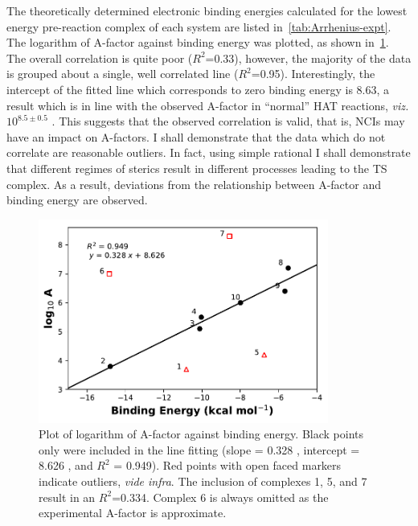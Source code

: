 The theoretically determined electronic binding energies calculated for the lowest energy pre-reaction complex of each system are listed in~\ref{tab:Arrhenius-expt}. The logarithm of A-factor against binding energy was plotted, as shown in~\ref{fig:Arrhenius}. The overall correlation is quite poor ($R^2$=0.33), however, the majority of the data is grouped about a single, well correlated line ($R^2$=0.95). Interestingly, the intercept of the fitted line which corresponds to zero binding energy is 8.63, a result which is in line with the observed A-factor in ``normal'' HAT reactions, \emph{viz. }$10^{8.5\pm0.5}$ \Ms.\cite{Benson1976} This suggests that the observed correlation is valid, that is, NCIs may have an impact on A-factors. I shall demonstrate that the data which do not correlate are reasonable outliers. In fact, using simple rational I shall demonstrate that different regimes of sterics result in different processes leading to the TS complex. As a result, deviations from the relationship between A-factor and binding energy are observed.

\begin{figure}[htb]
  \centering
  \includegraphics[width=0.85\textwidth]{figures/arrhenius-scatter.pdf}
  \caption[Plot of logarithm of A-factor against binding energy.]{Plot of logarithm of A-factor against binding energy. Black points only were included in the line fitting (slope = 0.328 \kcalmol, intercept = 8.626 \kcalmol, and $R^2$ = 0.949). Red points with open faced markers indicate outliers, \emph{vide infra}. The inclusion of complexes 1, 5, and 7 result in an $R^2$=0.334. Complex 6 is always omitted as the experimental A-factor is approximate.}
\label{fig:Arrhenius}
\end{figure}

